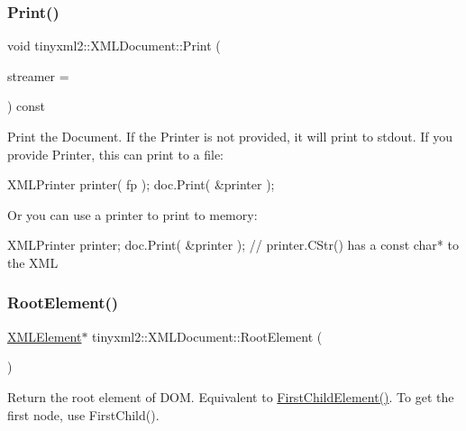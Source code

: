 \subsubsection{\texorpdfstring{Print()}{Print()}}
{\footnotesize\ttfamily void tinyxml2\+::\+X\+M\+L\+Document\+::\+Print (\begin{DoxyParamCaption}\item[{\mbox{\hyperlink{classtinyxml2_1_1_x_m_l_printer}{X\+M\+L\+Printer}} $\ast$}]{streamer = {} }\end{DoxyParamCaption}) const}

Print the Document. If the Printer is not provided, it will print to stdout. If you provide Printer, this can print to a file\+: \begin{DoxyVerb}XMLPrinter printer( fp );
doc.Print( &printer );
\end{DoxyVerb}


Or you can use a printer to print to memory\+: \begin{DoxyVerb}XMLPrinter printer;
doc.Print( &printer );
// printer.CStr() has a const char* to the XML
\end{DoxyVerb}
 \mbox{\label{classtinyxml2_1_1_x_m_l_document_ad2b70320d3c2a071c2f36928edff3e1c}} 
\subsubsection{\texorpdfstring{RootElement()}{RootElement()}}
{\footnotesize\ttfamily \mbox{\hyperlink{classtinyxml2_1_1_x_m_l_element}{X\+M\+L\+Element}}$\ast$ tinyxml2\+::\+X\+M\+L\+Document\+::\+Root\+Element (\begin{DoxyParamCaption}{ }\end{DoxyParamCaption})\hspace{0.3cm}{\ttfamily [inline]}}

Return the root element of D\+OM. Equivalent to \mbox{\hyperlink{classtinyxml2_1_1_x_m_l_node_a1bec132dcf085284e0a10755f2cf0d57}{First\+Child\+Element()}}. To get the first node, use First\+Child(). \mbox{\label{classtinyxml2_1_1_x_m_l_document_a73ac416b4a2aa0952e841220eb3da18f}} 
